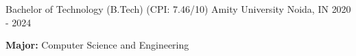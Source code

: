 
\begin{cventries}

  \cventry
    {Bachelor of Technology (B.Tech) {(CPI: 7.46/10)}} %
    {Amity University} %
    {Noida, IN} %
    {2020 - 2024} %
    {
      \begin{cvitems} %
        \item {\textbf{Major: }Computer Science and Engineering}
      \end{cvitems}
    }
\vspace{-0.2cm}
\end{cventries}

